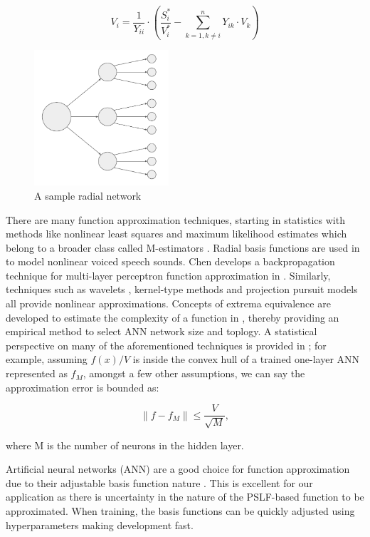 \documentclass[conference]{IEEEtran}
\begin{document}
\begin{equation} V_i = \frac{1}{Y_{ii}} \cdot \left(\frac{S_i^*}{V_i^*} - \displaystyle\sum_{k=1,k \neq i}^{n} Y_{ik} \cdot V_k\right) \label{form:nlpfeqn} \end{equation}

\begin{figure}[h]
	\centering
	\includegraphics[width=5cm]{radialnetwork.pdf}
	\caption{A sample radial network}
	\label{fig:radnetwork}
\end{figure}

There are many function approximation techniques, starting in statistics with methods like nonlinear least squares and maximum likelihood estimates which belong to a broader class called M-estimators \cite{haya2000}. Radial basis functions are used in \cite{mann1999} to model nonlinear voiced speech sounds. Chen develops a backpropagation technique for multi-layer perceptron function approximation in \cite{chen1994}. Similarly, techniques such as wavelets \cite{zhang1992}, kernel-type methods \cite{lowe1991} and projection pursuit models \cite{fried1981} all provide nonlinear approximations. Concepts of extrema equivalence are developed to estimate the complexity of a function in \cite{zhang2004}, thereby providing an empirical method to select ANN network size and toplogy. A statistical perspective on many of the aforementioned techniques is provided in \cite{cheng1994}; for example, assuming $f(x)/V$ is inside the convex hull of a trained one-layer ANN represented as $f_{M}$, amongst a few other assumptions, we can say the approximation error is bounded as:

\begin{equation} \|f - f_{M}\| \leqslant \frac{V}{\sqrt{M}}, \label{form:1layerannbound} \end{equation}

\noindent where M is the number of neurons in the hidden layer.

Artificial neural networks (ANN) are a good choice for function approximation due to their adjustable basis function nature \cite{barr1994}. This is excellent for our application as there is uncertainty in the nature of the PSLF-based function to be approximated. When training, the basis functions can be quickly adjusted using hyperparameters making development fast.
\end{document}
